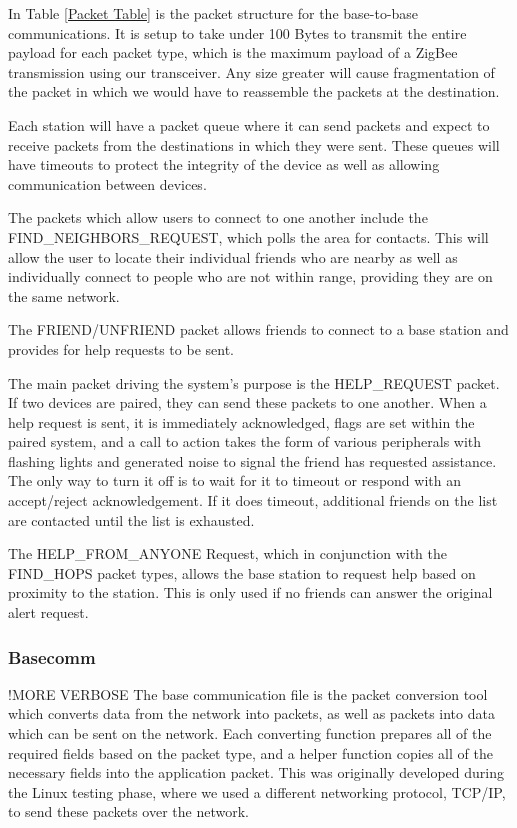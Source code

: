 \documentclass[journal,compsoc]{IEEEtran}
\begin{document}
In Table \ref{Packet Table} is the packet structure for the base-to-base communications.  It is setup to take under 100 Bytes to transmit the entire payload for each packet type, which is the maximum payload of a ZigBee transmission using our transceiver.  Any size greater will cause fragmentation of the packet in which we would have to reassemble the packets at the destination.

Each station will have a packet queue where it can send packets and expect to receive packets from the destinations in which they were sent.  These queues will have timeouts to protect the integrity of the device as well as allowing communication between devices.

The packets which allow users to connect to one another include the FIND\_NEIGHBORS\_REQUEST, which polls the area for contacts.  This will allow the user to locate their individual friends who are nearby as well as individually connect to people who are not within range, providing they are on the same network.

The FRIEND/UNFRIEND packet allows friends to connect to a base station and provides for help requests to be sent.

The main packet driving the system's purpose is the HELP\_REQUEST packet.  If two devices are paired, they can send these packets to one another.  When a help request is sent, it is immediately acknowledged, flags are set within the paired system, and a call to action takes the form of various peripherals with flashing lights and generated noise to signal the friend has requested assistance.  The only way to turn it off is to wait for it to timeout or respond with an accept/reject acknowledgement.  If it does timeout, additional friends on the list are contacted until the list is exhausted.

The HELP\_FROM\_ANYONE Request, which in conjunction with the FIND\_HOPS packet types, allows the base station to request help based on proximity to the station.  This is only used if no friends can answer the original alert request.

\subsubsection{Basecomm}
!MORE VERBOSE\newline
The base communication file is the packet conversion tool which converts data from the network into packets, as well as packets into data which can be sent on the network. Each converting function prepares all of the required fields based on the packet type, and a helper function copies all of the necessary fields into the application packet. This was originally developed during the Linux testing phase, where we used a different networking protocol, TCP/IP, to send these packets over the network.
\end{document}
